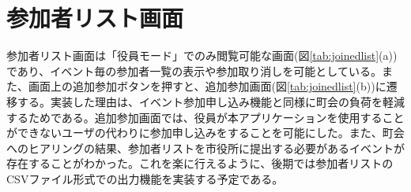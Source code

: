 \section{参加者リスト画面}%
参加者リスト画面は「役員モード」でのみ閲覧可能な画面(図\ref{tab:joinedlist}(a))であり、イベント毎の参加者一覧の表示や参加取り消しを可能としている。また、画面上の追加参加ボタンを押すと、追加参加画面(図\ref{tab:joinedlist}(b))に遷移する。実装した理由は、イベント参加申し込み機能と同様に町会の負荷を軽減するためである。追加参加画面では、役員が本アプリケーションを使用することができないユーザの代わりに参加申し込みをすることを可能にした。また、町会へのヒアリングの結果、参加者リストを市役所に提出する必要があるイベントが存在することがわかった。これを楽に行えるように、後期では参加者リストのCSVファイル形式での出力機能を実装する予定である。


